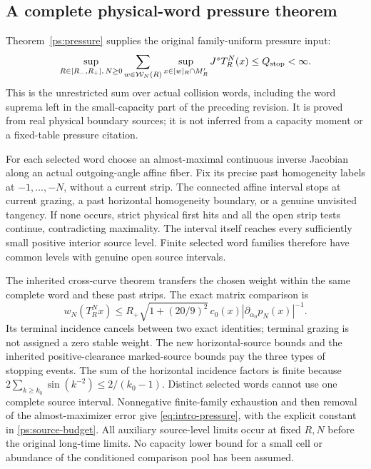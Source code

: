 \subsection*{A complete physical-word pressure theorem}
Theorem~\ref{ps:pressure} supplies the original family-uniform
pressure input:
\begin{equation}\label{eq:intro-pressure}
 \sup_{R\in[R_-,R_+],\,N\ge0}
 \sum_{w\in\mathcal W_N(R)}
       \sup_{x\in[w]_R\cap M_R'}J^sT_R^N(x)
 \le Q_{\rm stop}<\infty.
\end{equation}
This is the unrestricted sum over actual collision words, including
the word suprema left in the small-capacity part of the preceding
revision. It is proved from real physical boundary sources; it is
not inferred from a capacity moment or a fixed-table pressure citation.

For each selected word choose an almost-maximal continuous inverse
Jacobian along an actual outgoing-angle affine fiber. Fix its
precise past homogeneity labels at $-1,\ldots,-N$, without a
current strip. The connected affine interval stops at current
grazing, a past horizontal homogeneity boundary, or a genuine
unvisited tangency. If none occurs, strict physical first hits
and all the open strip tests continue, contradicting maximality.
The interval itself reaches every sufficiently small positive
interior source level. Finite selected word families therefore
have common levels with genuine open source intervals.

The inherited cross-curve theorem transfers the chosen weight
within the same complete word and these past strips. The exact
matrix comparison is
\[
 w_N(T_R^Nx)\le R_+\sqrt{1+(20/9)^2}\,
          c_0(x)|\partial_{\alpha_0}p_N(x)|^{-1}.
\]
Its terminal incidence cancels between two exact identities;
terminal grazing is not assigned a zero stable weight. The new
horizontal-source bounds and the inherited positive-clearance
marked-source bounds pay the three types of stopping events.
The sum of the horizontal incidence factors is finite because
$2\sum_{k\ge k_0}\sin(k^{-2})\le2/(k_0-1)$.
Distinct selected words cannot use one complete source interval.
Nonnegative finite-family exhaustion and then removal of the
almost-maximizer error give \eqref{eq:intro-pressure}, with the
explicit constant in \eqref{ps:source-budget}.
All auxiliary source-level limits occur at fixed $R,N$ before
the original long-time limits. No capacity lower bound for a
small cell or abundance of the conditioned comparison pool has
been assumed.

